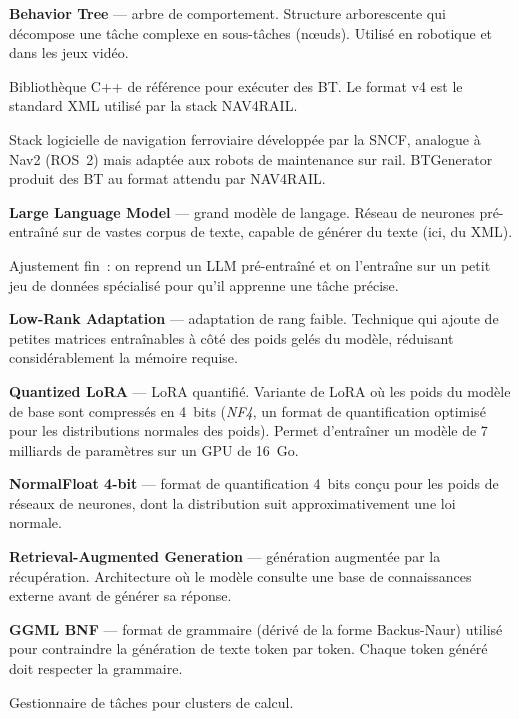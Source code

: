 \documentclass[a4paper,11pt]{article}
\newcommand{\tech}[1]{\textsl{#1}}
\begin{document}
\begin{description}[leftmargin=3.5cm, style=nextline]
    \item[BT] \textbf{Behavior Tree} --- arbre de comportement. Structure
    arborescente qui décompose une tâche complexe en sous-tâches (nœuds).
    Utilisé en robotique et dans les jeux vidéo.
    \item[BehaviorTree.CPP] Bibliothèque C++ de référence pour exécuter des
    BT. Le format v4 est le standard XML utilisé par la stack NAV4RAIL.
    \item[NAV4RAIL] Stack logicielle de navigation ferroviaire développée par
    la SNCF, analogue à Nav2 (ROS~2) mais adaptée aux robots de maintenance
    sur rail. BTGenerator produit des BT au format attendu par NAV4RAIL.
    \item[LLM] \textbf{Large Language Model} --- grand modèle de langage.
    Réseau de neurones pré-entraîné sur de vastes corpus de texte, capable de
    générer du texte (ici, du XML).
    \item[Fine-tuning] Ajustement fin~: on reprend un LLM pré-entraîné et on
    l'entraîne sur un petit jeu de données spécialisé pour qu'il apprenne une
    tâche précise.
    \item[LoRA] \textbf{Low-Rank Adaptation} --- adaptation de rang faible.
    Technique qui ajoute de petites matrices entraînables à côté des poids
    gelés du modèle, réduisant considérablement la mémoire requise.
    \item[QLoRA] \textbf{Quantized LoRA} --- LoRA quantifié. Variante de
    LoRA où les poids du modèle de base sont compressés en 4~bits (\tech{NF4},
    un format de quantification optimisé pour les distributions normales des
    poids). Permet d'entraîner un modèle de 7 milliards de paramètres sur un
    GPU de 16~Go.
    \item[NF4] \textbf{NormalFloat 4-bit} --- format de quantification 4~bits
    conçu pour les poids de réseaux de neurones, dont la distribution suit
    approximativement une loi normale.
    \item[RAG] \textbf{Retrieval-Augmented Generation} --- génération
    augmentée par la récupération. Architecture où le modèle consulte une base
    de connaissances externe avant de générer sa réponse.
    \item[GBNF] \textbf{GGML BNF} --- format de grammaire (dérivé de la
    forme Backus-Naur) utilisé pour contraindre la génération de texte token
    par token. Chaque token généré doit respecter la grammaire.
    \item[SLURM] Gestionnaire de tâches pour clusters de calcul.

\end{description}
\end{document}
